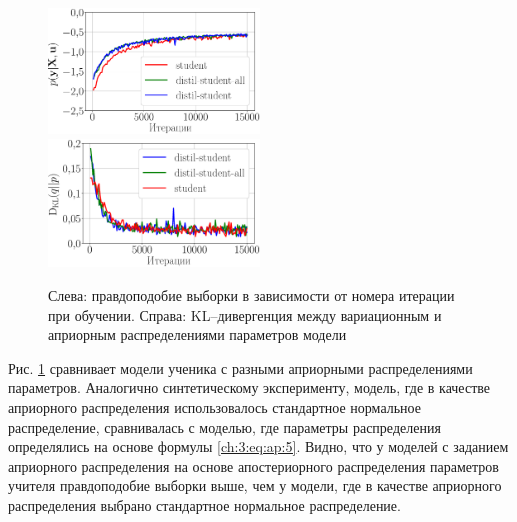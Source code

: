 \begin{figure}[h!]
\includegraphics[width=0.5\textwidth]{results/bayesdistil/fashionmnist_likelihood_2_layers.eps}
\includegraphics[width=0.5\textwidth]{results/bayesdistil/fashionmnist_D_KL_2_layers.eps}
\caption{Слева: правдоподобие выборки в зависимости от номера итерации при обучении. Справа: KL--дивергенция между вариационным и априорным распределениями параметров модели}
\label{ch:3:exp:fig3}
\end{figure}

Рис. \ref{ch:3:exp:fig3} сравнивает модели ученика с разными априорными распределениями параметров.
Аналогично синтетическому эксперименту, модель, где в качестве априорного распределения использовалось стандартное нормальное распределение, сравнивалась с моделью, где параметры распределения определялись на основе формулы \eqref{ch:3:eq:ap:5}. Видно, что у моделей с заданием априорного распределения на основе апостериорного распределения параметров учителя правдоподобие выборки выше, чем у модели, где в качестве априорного распределения выбрано стандартное нормальное распределение.

